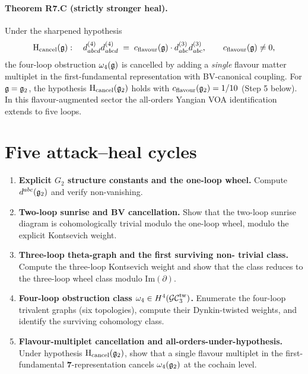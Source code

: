 \paragraph{Theorem R7.C (strictly stronger heal).}
Under the sharpened hypothesis
\begin{equation}
\label{eq:r7-sharpened-hypothesis}
 \mathrm{H}_{\mathrm{cancel}}(\mathfrak{g}):
 \quad d^{(4)}_{abcd} d^{(4)}_{abcd} \;=\; c_{\mathrm{flavour}}(\mathfrak{g}) \cdot
 d^{(3)}_{abc} d^{(3)}_{abc}, \qquad c_{\mathrm{flavour}}(\mathfrak{g}) \ne 0,
\end{equation}
the four-loop obstruction $\omega_4(\mathfrak{g})$ is cancelled by adding a
\emph{single} flavour matter multiplet in the first-fundamental
representation with BV-canonical coupling.
For $\mathfrak{g} = \mathfrak{g}_2$, the hypothesis $\mathrm{H}_{\mathrm{cancel}}(\mathfrak{g}_2)$
holds with $c_{\mathrm{flavour}}(\mathfrak{g}_2) = 1/10$ (Step 5 below).
In this flavour-augmented sector the all-orders Yangian VOA
identification extends to five loops.

\section*{Five attack--heal cycles}

\begin{enumerate}
\item[(A1)] \textbf{Explicit $G_2$ structure constants and the one-loop
wheel.} Compute $d^{abc}(\mathfrak{g}_2)$ and verify non-vanishing.
\item[(A2)] \textbf{Two-loop sunrise and BV cancellation.} Show that the
two-loop sunrise diagram is cohomologically trivial modulo the one-loop
wheel, modulo the explicit Kontsevich weight.
\item[(A3)] \textbf{Three-loop theta-graph and the first surviving non-
trivial class.} Compute the three-loop Kontsevich weight and show that
the class reduces to the three-loop wheel class modulo $\mathrm{Im}(\partial)$.
\item[(A4)] \textbf{Four-loop obstruction class $\omega_4 \in H^4(\mathcal{GC}^{\mathrm{tw}}_3)$.}
Enumerate the four-loop trivalent graphs (six topologies), compute their
Dynkin-twisted weights, and identify the surviving cohomology class.
\item[(A5)] \textbf{Flavour-multiplet cancellation and all-orders-under-hypothesis.}
Under hypothesis $\mathrm H_{\mathrm{cancel}}(\mathfrak{g}_2)$, show that a single
flavour multiplet in the first-fundamental $\mathbf 7$-representation
cancels $\omega_4(\mathfrak{g}_2)$ at the cochain level.
\end{enumerate}

